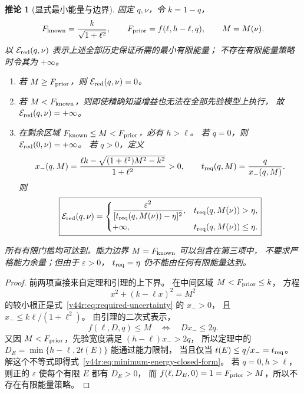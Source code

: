 \documentclass[11pt,a4paper]{article}
\numberwithin{equation}{section}
\newtheorem{corollary}[theorem]{推论}
\theoremstyle{definition}
\begin{document}
\begin{corollary}[显式最小能量与边界]
\label{v44r:cor:minimum-energy}
固定 $q,\nu$，令 $k=1-q$，
\begin{equation}
 F_{\rm known}=\frac{k}{\sqrt{1+\ell^2}},
 \qquad F_{\rm prior}=f(\ell,h-\ell,q),
 \qquad M=M(\nu).
 \label{v44r:eq:known-prior-norms}
\end{equation}
以 $\mathcal E_{\rm red}(q,\nu)$ 表示上述全部历史保证所需的最小有限能量；
不存在有限能量策略时令其为 $+\infty$。
\begin{enumerate}
 \item 若 $M\ge F_{\rm prior}$，则 $\mathcal E_{\rm red}(q,\nu)=0$。
 \item 若 $M<F_{\rm known}$，则即使精确知道增益也无法在全部先验模型上执行，
 故 $\mathcal E_{\rm red}(q,\nu)=+\infty$。
 \item 在剩余区域 $F_{\rm known}\le M<F_{\rm prior}$，必有 $h>\ell$。
 若 $q=0$，则 $\mathcal E_{\rm red}(0,\nu)=+\infty$。
 若 $q>0$，定义
 \begin{equation}
 x_-(q,M)=
 \frac{\ell k-\sqrt{(1+\ell^2)M^2-k^2}}{1+\ell^2}>0,
 \qquad t_{\rm req}(q,M)=\frac{q}{x_-(q,M)}.
 \label{v44r:eq:required-uncertainty}
 \end{equation}
 则
 \begin{equation}
 \boxed{
 \mathcal E_{\rm red}(q,\nu)=
 \begin{cases}
 \displaystyle\frac{\varepsilon^2}{[t_{\rm req}(q,M(\nu))-\eta]^2},
       &t_{\rm req}(q,M(\nu))>\eta,\\[2mm]
 +\infty,&t_{\rm req}(q,M(\nu))\le\eta.
 \end{cases}}
 \label{v44r:eq:minimum-energy-closed-form}
 \end{equation}
\end{enumerate}
所有有限门槛均可达到。能力边界 $M=F_{\rm known}$ 可以包含在第三项中，
不要求严格能力余量；但由于 $\varepsilon>0$，
$t_{\rm req}=\eta$ 仍不能由任何有限能量达到。
\end{corollary}

\begin{proof}
前两项直接来自定理和引理的上下界。
在中间区域 $M<F_{\rm prior}\le k$，
方程
\[
 x^2+(k-\ell x)^2=M^2
\]
的较小根正是式~\eqref{v44r:eq:required-uncertainty} 的 $x_->0$，
且 $x_-\le k\ell/(1+\ell^2)$。
由引理的二次式表示，
\[
 f(\ell,D,q)\le M
 \quad\Longleftrightarrow\quad
 D x_-\le2q.
\]
又因 $M<F_{\rm prior}$，先验宽度满足
$(h-\ell)x_->2q$，
所以定理中的 $D_E=\min\{h-\ell,2t(E)\}$ 能通过能力限制，
当且仅当 $t(E)\le q/x_-=t_{\rm req}$。
解这个不等式即得式~\eqref{v44r:eq:minimum-energy-closed-form}。
若 $q=0,h>\ell$，则正的 $\varepsilon$ 使每个有限 $E$ 都有 $D_E>0$，
而 $f(\ell,D_E,0)=1=F_{\rm prior}>M$，所以不存在有限能量策略。
\end{proof}
\end{document}
